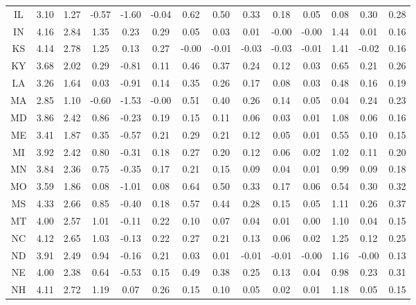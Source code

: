 \begin{table}
\begin{tabular}{cccccccccccccc}
   IL &  3.10 &  1.27 & -0.57 & -1.60 & -0.04 &  0.62 &  0.50 &  0.33 &  0.18 &  0.05 &    0.08 &     0.30 &      0.28 \\
   IN &  4.16 &  2.84 &  1.35 &  0.23 &  0.29 &  0.05 &  0.03 &  0.01 & -0.00 & -0.00 &    1.44 &     0.01 &      0.16 \\
   KS &  4.14 &  2.78 &  1.25 &  0.13 &  0.27 & -0.00 & -0.01 & -0.03 & -0.03 & -0.01 &    1.41 &    -0.02 &      0.16 \\
   KY &  3.68 &  2.02 &  0.29 & -0.81 &  0.11 &  0.46 &  0.37 &  0.24 &  0.12 &  0.03 &    0.65 &     0.21 &      0.26 \\
   LA &  3.26 &  1.64 &  0.03 & -0.91 &  0.14 &  0.35 &  0.26 &  0.17 &  0.08 &  0.03 &    0.48 &     0.16 &      0.19 \\
   MA &  2.85 &  1.10 & -0.60 & -1.53 & -0.00 &  0.51 &  0.40 &  0.26 &  0.14 &  0.05 &    0.04 &     0.24 &      0.23 \\
   MD &  3.86 &  2.42 &  0.86 & -0.23 &  0.19 &  0.15 &  0.11 &  0.06 &  0.03 &  0.01 &    1.08 &     0.06 &      0.16 \\
   ME &  3.41 &  1.87 &  0.35 & -0.57 &  0.21 &  0.29 &  0.21 &  0.12 &  0.05 &  0.01 &    0.55 &     0.10 &      0.15 \\
   MI &  3.92 &  2.42 &  0.80 & -0.31 &  0.18 &  0.27 &  0.20 &  0.12 &  0.06 &  0.02 &    1.02 &     0.11 &      0.20 \\
   MN &  3.84 &  2.36 &  0.75 & -0.35 &  0.17 &  0.21 &  0.15 &  0.09 &  0.04 &  0.01 &    0.99 &     0.09 &      0.18 \\
   MO &  3.59 &  1.86 &  0.08 & -1.01 &  0.08 &  0.64 &  0.50 &  0.33 &  0.17 &  0.06 &    0.54 &     0.30 &      0.32 \\
   MS &  4.33 &  2.66 &  0.85 & -0.40 &  0.18 &  0.57 &  0.44 &  0.28 &  0.15 &  0.05 &    1.11 &     0.26 &      0.37 \\
   MT &  4.00 &  2.57 &  1.01 & -0.11 &  0.22 &  0.10 &  0.07 &  0.04 &  0.01 &  0.00 &    1.10 &     0.04 &      0.15 \\
   NC &  4.12 &  2.65 &  1.03 & -0.13 &  0.22 &  0.27 &  0.21 &  0.13 &  0.06 &  0.02 &    1.25 &     0.12 &      0.25 \\
   ND &  3.91 &  2.49 &  0.94 & -0.16 &  0.21 &  0.03 &  0.01 & -0.01 & -0.01 & -0.00 &    1.16 &    -0.00 &      0.13 \\
   NE &  4.00 &  2.38 &  0.64 & -0.53 &  0.15 &  0.49 &  0.38 &  0.25 &  0.13 &  0.04 &    0.98 &     0.23 &      0.31 \\
   NH &  4.11 &  2.72 &  1.19 &  0.07 &  0.26 &  0.15 &  0.10 &  0.05 &  0.02 &  0.01 &    1.18 &     0.05 &      0.15 \\

\end{tabular}
\end{table}
